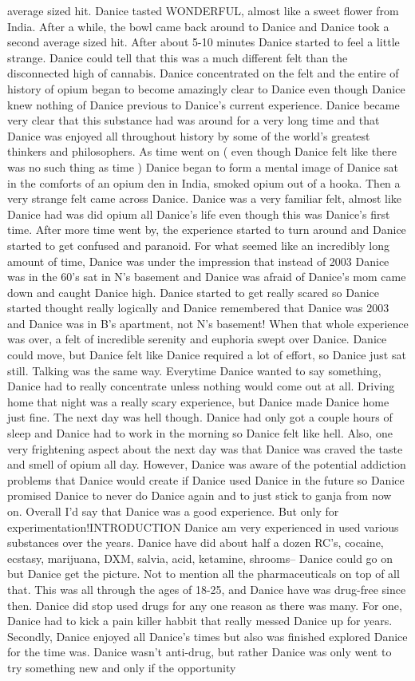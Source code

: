 \documentclass[12pt]{book}
\begin{document}
average sized hit. Danice tasted WONDERFUL, almost like a sweet flower from India. After a while, the bowl came back around to Danice and Danice took a second average sized hit. After about 5-10 minutes Danice started to feel a little strange. Danice could tell that this was a much different felt than the disconnected high of cannabis. Danice concentrated on the felt and the entire of history of opium began to become amazingly clear to Danice even though Danice knew nothing of Danice previous to Danice's current experience. Danice became very clear that this substance had was around for a very long time and that Danice was enjoyed all throughout history by some of the world's greatest thinkers and philosophers. As time went on ( even though Danice felt like there was no such thing as time ) Danice began to form a mental image of Danice sat in the comforts of an opium den in India, smoked opium out of a hooka. Then a very strange felt came across Danice. Danice was a very familiar felt, almost like Danice had was did opium all Danice's life even though this was Danice's first time. After more time went by, the experience started to turn around and Danice started to get confused and paranoid. For what seemed like an incredibly long amount of time, Danice was under the impression that instead of 2003 Danice was in the 60's sat in N's basement and Danice was afraid of Danice's mom came down and caught Danice high. Danice started to get really scared so Danice started thought really logically and Danice remembered that Danice was 2003 and Danice was in B's apartment, not N's basement! When that whole experience was over, a felt of incredible serenity and euphoria swept over Danice. Danice could move, but Danice felt like Danice required a lot of effort, so Danice just sat still. Talking was the same way. Everytime Danice wanted to say something, Danice had to really concentrate unless nothing would come out at all. Driving home that night was a really scary experience, but Danice made Danice home just fine. The next day was hell though. Danice had only got a couple hours of sleep and Danice had to work in the morning so Danice felt like hell. Also, one very frightening aspect about the next day was that Danice was craved the taste and smell of opium all day. However, Danice was aware of the potential addiction problems that Danice would create if Danice used Danice in the future so Danice promised Danice to never do Danice again and to just stick to ganja from now on. Overall I'd say that Danice was a good experience. But only for experimentation!INTRODUCTION Danice am very experienced in used various substances over the years. Danice have did about half a dozen RC's, cocaine, ecstasy, marijuana, DXM, salvia, acid, ketamine, shrooms-- Danice could go on but Danice get the picture. Not to mention all the pharmaceuticals on top of all that. This was all through the ages of 18-25, and Danice have was drug-free since then. Danice did stop used drugs for any one reason as there was many. For one, Danice had to kick a pain killer habbit that really messed Danice up for years. Secondly, Danice enjoyed all Danice's times but also was finished explored Danice for the time was. Danice wasn't anti-drug, but rather Danice was only went to try something new and only if the opportunity 
\end{document}
